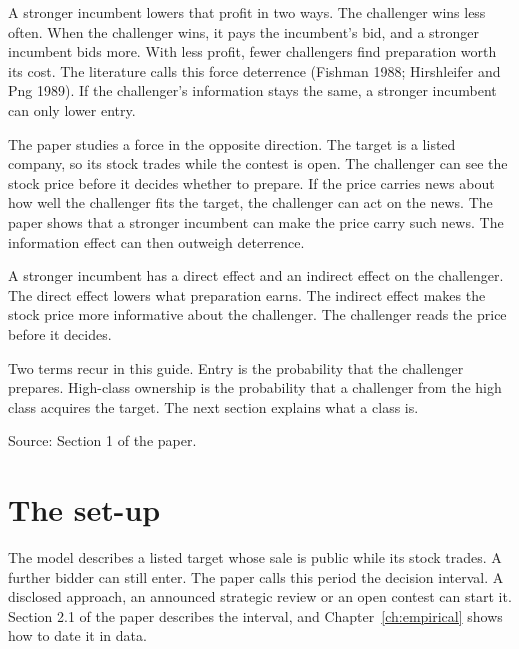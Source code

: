 A stronger incumbent lowers that profit in two ways. The challenger wins less often. When the challenger wins, it pays the incumbent's bid, and a stronger incumbent bids more. With less profit, fewer challengers find preparation worth its cost. The literature calls this force deterrence (Fishman 1988; Hirshleifer and Png 1989). If the challenger's information stays the same, a stronger incumbent can only lower entry.

The paper studies a force in the opposite direction. The target is a listed company, so its stock trades while the contest is open. The challenger can see the stock price before it decides whether to prepare. If the price carries news about how well the challenger fits the target, the challenger can act on the news. The paper shows that a stronger incumbent can make the price carry such news. The information effect can then outweigh deterrence.

\begin{keyidea}
A stronger incumbent has a direct effect and an indirect effect on the challenger. The direct effect lowers what preparation earns. The indirect effect makes the stock price more informative about the challenger. The challenger reads the price before it decides.
\end{keyidea}

Two terms recur in this guide. Entry is the probability that the challenger prepares. High-class ownership is the probability that a challenger from the high class acquires the target. The next section explains what a class is.

{\small\color{notegrey}Source: Section 1 of the paper.}

\section{The set-up}\label{sec:story-setting}

The model describes a listed target whose sale is public while its stock trades. A further bidder can still enter. The paper calls this period the decision interval. A disclosed approach, an announced strategic review or an open contest can start it. Section 2.1 of the paper describes the interval, and Chapter~\ref{ch:empirical} shows how to date it in data.

